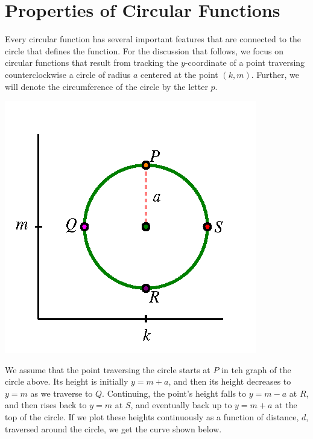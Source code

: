 \documentclass[nooutcomes, noauthor]{ximera}
\begin{document}


\section{Properties of Circular Functions}

Every circular function has several important features that are connected to the circle that defines the function.  For the discussion that follows, we focus on circular functions that result from tracking the \(y\)-coordinate of a point traversing counterclockwise a circle of radius \(a\) centered at the point \((k,m)\).  Further, we will denote the circumference of the circle by the letter \(p\).%

\begin{image}
\includegraphics{traversing-circular-properties-circle.png}
\end{image}

We assume that the point traversing the circle starts at \(P\) in teh graph of the circle above.  Its height is initially \(y = m + a\), and then its height decreases to \(y = m\) as we traverse to \(Q\).  Continuing, the point's height falls to \(y = m - a\) at \(R\), and then rises back to \(y = m\) at \(S\), and eventually back up to \(y = m+a\) at the top of the circle.  If we plot these heights continuously as a function of distance, \(d\), traversed around the circle, we get the curve shown below. 
\end{document}
